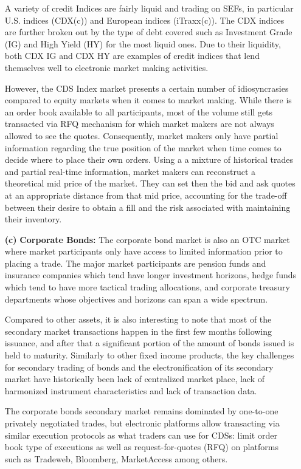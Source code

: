 \begin{enumerate}
A variety of credit Indices are fairly liquid and trading on SEFs, in particular U.S. indices (CDX(c)) and European indices (iTraxx(c)). The CDX indices are further broken out by the type of debt covered such as Investment Grade (IG) and High Yield (HY) for the most liquid ones. Due to their liquidity, both CDX IG and CDX HY are examples of credit indices that lend themselves well to electronic market making activities.


However, the CDS Index market presents a certain number of idiosyncrasies compared to equity markets when it comes to market making. While there is an order book available to all participants, most of the volume still gets transacted via RFQ mechanism for which market makers are not always allowed to see the quotes. Consequently, market makers only have partial information regarding the true position of the market when time comes to decide where to place their own orders. Using a a mixture of historical trades and partial real-time information, market makers can reconstruct a theoretical mid price of the market. They can set then the bid and ask quotes at an appropriate distance from that mid price, accounting for the trade-off between their desire to obtain a fill and the risk associated with maintaining their inventory. 


\item[\textbf{(c)}] \textbf{Corporate Bonds:} The corporate bond market is also an OTC market where market participants only have access to limited information prior to placing a trade. The major market participants are pension funds and insurance companies which tend have longer investment horizons, hedge funds which tend to have more tactical trading allocations, and corporate treasury departments whose objectives and horizons can span a wide spectrum.


Compared to other assets, it is also interesting to note that most of the secondary market transactions happen in the first few months following issuance, and after that a significant portion of the amount of bonds issued is held to maturity. Similarly to other fixed income products, the key challenges for secondary trading of bonds and the electronification of its secondary market have historically been lack of centralized market place, lack of harmonized instrument characteristics and lack of transaction data.


The corporate bonds secondary market remains dominated by one-to-one privately negotiated trades, but electronic platforms allow transacting via similar execution protocols as what traders can use for CDSs: limit order book type of executions as well as request-for-quotes (RFQ) on platforms such as Tradeweb, Bloomberg, MarketAccess among others.



\end{enumerate}
